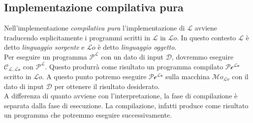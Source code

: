 \documentclass[12pt]{report}
\begin{document}
	\subsection{Implementazione compilativa pura}
	Nell'implementazione \textit{compilativa pura} l'implementazione di $\mathcal{L}$ avviene traducendo esplicitamente i programmi scritti in $\mathcal{L}$ in $\mathcal{L}o$. In questo contesto $\mathcal{L}$ è detto \textit{linguaggio sorgente} e $\mathcal{L}o$ è detto \textit{linguaggio oggetto}. \\
	Per eseguire un programma $\mathcal{P^L}$ con un dato di input $\mathcal{D}$, dovremmo eseguire $\mathcal{C_{L,L\text{o}}}$ con $\mathcal{P^L}$. Questo produrrà come risultato un programma compilato $\mathcal{P\text{c}^{L\text{o}}}$ scritto in $\mathcal{L}o$. A questo punto potremo eseguire $\mathcal{P\text{c}^{L\text{o}}}$ sulla macchina $\mathcal{M}o_{\mathcal{L}o}$ con il dato di input $\mathcal{D}$ per ottenere il risultato desiderato. \\
	{
	}
	A differenza di quanto avviene con l'interpretazione, la fase di compilazione è separata dalla fase di esecuzione. La compilazione, infatti produce come risultato un programma che potremmo eseguire successivamente.
\end{document}
